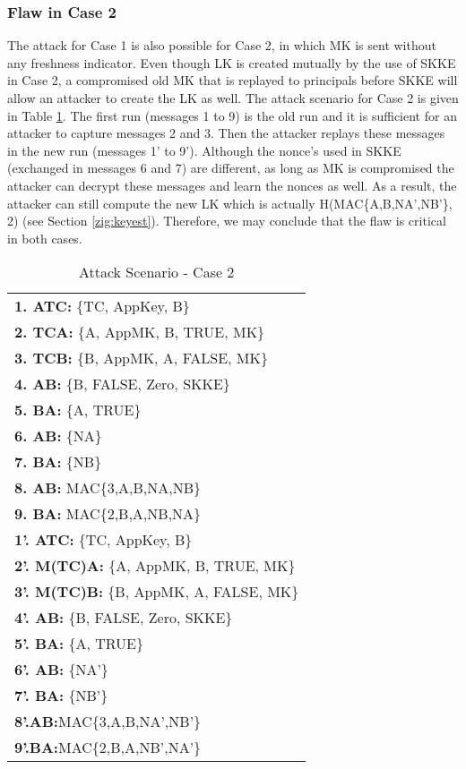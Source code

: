\subsubsection{Flaw in Case 2}
The attack for Case 1 is also possible for Case 2, in which MK is sent without any freshness indicator. 
Even though LK is created mutually by the use of SKKE in Case 2, 
a compromised old MK that is replayed to principals before SKKE will allow an attacker to create the LK as well. 
The attack scenario for Case 2 is given in Table \ref{tab:att2}. 
The first run (messages 1 to 9) is the old run and it is sufficient for an attacker to capture messages 2 and 3. 
Then the attacker replays these messages in the new run (messages 1' to 9').
Although the nonce's used in SKKE (exchanged in messages 6 and 7) are different, 
as long as MK is compromised the attacker can decrypt these messages and learn the nonces as well.
As a result, the attacker can still compute the new LK which is actually H(MAC\{A,B,NA',NB'\}, 2) (see Section \ref{zig:keyest}).
Therefore, we may conclude that the flaw is critical in both cases. 

\begin{table}\caption{Attack Scenario - Case 2}
\label{tab:att2}
\centering
\begin{tabular}{l}
\hline
\textbf{1. ATC:} \{TC, AppKey, B\}   \\
\textbf{2. TCA:} \{A, AppMK, B, TRUE, MK\} \\
\textbf{3. TCB:} \{B, AppMK, A, FALSE, MK\} \\
\textbf{4. AB:} \{B, FALSE, Zero, SKKE\} \\
\textbf{5. BA:} \{A, TRUE\}                 \\                           
\textbf{6. AB:} \{NA\}      \\                
\textbf{7. BA:} \{NB\}                  \\                       
\textbf{8. AB:} MAC\{3,A,B,NA,NB\}        \\
\textbf{9. BA:} MAC\{2,B,A,NB,NA\}        \\
\hline
\textbf{1'. ATC:} \{TC, AppKey, B\}   \\
\textbf{2'. M(TC)A:} \{A, AppMK, B, TRUE, MK\} \\
\textbf{3'. M(TC)B:} \{B, AppMK, A, FALSE, MK\} \\
\textbf{4'. AB:} \{B, FALSE, Zero, SKKE\} \\
\textbf{5'. BA:} \{A, TRUE\}                 \\                           
\textbf{6'. AB:} \{NA'\}      \\                
\textbf{7'. BA:} \{NB'\}                  \\                       
\textbf{8'.\hspace{0.02cm}AB:}\hspace{0.02cm}MAC\{3,A,B,NA',NB'\}        \\
\textbf{9'.\hspace{0.02cm}BA:}\hspace{0.02cm}MAC\{2,B,A,NB',NA'\}        \\
\hline
\end{tabular}
\end{table}

